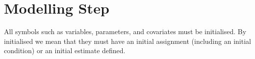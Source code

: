\section{Modelling Step}

\begin{valrules}
 All symbols such as variables,
parameters, and covariates must be initialised. By initialised we mean
that they must have an initial assignment (including an initial
condition) or an initial estimate defined.
\end{valrules}




